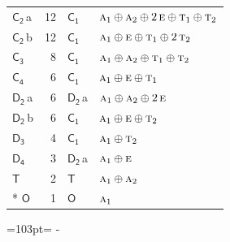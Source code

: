 \documentclass[10pt,a4paper]{article}
\newcommand{\needspace}[1]{\par\penalty-100\begingroup\dimen0=#1\relax\dimen2=\pagegoal
  \advance\dimen2-\pagetotal\ifdim\dimen0>\dimen2\relax\ifdim\dimen2>0pt\vfil\break\fi\fi
  \endgroup}
\numberwithin{equation}{section}
\newcommand{\grp}[1]{\mathsf{#1}}
\newcommand{\irr}[1]{\text{\normalfont\scshape #1}}
\newcommand{\clsletter}[1]{\,{\scriptsize\color{black!55}#1}}
\newlength{\fillwidth}\newlength{\cellwidth}\newlength{\colwidth}
\begin{document}
{\begin{longtable}{@{}lrl>{\RaggedRight\arraybackslash}p{\fillwidth}@{}}
\href{C2.pdf}{$\grp{C_{2}}$}\clsletter{a} & 12 & \href{C1.pdf}{$\grp{C_{1}}$} & $\irr{a}_{1}\oplus \irr{a}_{2}\oplus 2\,\irr{e}\oplus \irr{t}_{1}\oplus \irr{t}_{2}$\\
\href{C2.pdf}{$\grp{C_{2}}$}\clsletter{b} & 12 & \href{C1.pdf}{$\grp{C_{1}}$} & $\irr{a}_{1}\oplus \irr{e}\oplus \irr{t}_{1}\oplus 2\,\irr{t}_{2}$\\
\href{C3.pdf}{$\grp{C_{3}}$} & 8 & \href{C1.pdf}{$\grp{C_{1}}$} & $\irr{a}_{1}\oplus \irr{a}_{2}\oplus \irr{t}_{1}\oplus \irr{t}_{2}$\\
\href{C4.pdf}{$\grp{C_{4}}$} & 6 & \href{C1.pdf}{$\grp{C_{1}}$} & $\irr{a}_{1}\oplus \irr{e}\oplus \irr{t}_{1}$\\
\href{D2.pdf}{$\grp{D_{2}}$}\clsletter{a} & 6 & \href{D2.pdf}{$\grp{D_{2}}$}\clsletter{a} & $\irr{a}_{1}\oplus \irr{a}_{2}\oplus 2\,\irr{e}$\\
\href{D2.pdf}{$\grp{D_{2}}$}\clsletter{b} & 6 & \href{C1.pdf}{$\grp{C_{1}}$} & $\irr{a}_{1}\oplus \irr{e}\oplus \irr{t}_{2}$\\
\href{D3.pdf}{$\grp{D_{3}}$} & 4 & \href{C1.pdf}{$\grp{C_{1}}$} & $\irr{a}_{1}\oplus \irr{t}_{2}$\\
\href{D4.pdf}{$\grp{D_{4}}$} & 3 & \href{D2.pdf}{$\grp{D_{2}}$}\clsletter{a} & $\irr{a}_{1}\oplus \irr{e}$\\
\href{T.pdf}{$\grp{T}$} & 2 & \href{T.pdf}{$\grp{T}$} & $\irr{a}_{1}\oplus \irr{a}_{2}$\\*
\href{O.pdf}{$\grp{O}$} & 1 & \href{O.pdf}{$\grp{O}$} & $\irr{a}_{1}$\\
\bottomrule\end{longtable}}
\needspace{103pt}
\end{document}
